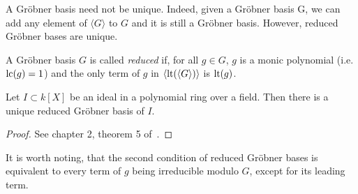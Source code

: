 A Gröbner basis need not be unique. Indeed, given a Gröbner basis G, we can add any element of $\langle G \rangle$ to $G$ and it is still a Gröbner basis. However, reduced Gröbner bases are unique.

\begin{definition}
  A Gröbner basis $G$ is called \textit{reduced} if, for all $g \in G$, $g$ is a monic polynomial (i.e. $\operatorname{lc}(g) = 1$) and the only term of $g$ in $\langle \operatorname{lt}(\langle G \rangle) \rangle$ is $\operatorname{lt}(g)$.
\end{definition}
\begin{theorem}
  Let $I \subset k[X]$ be an ideal in a polynomial ring over a field. Then there is a unique reduced Gröbner basis of $I$.
\end{theorem}
\begin{proof}
  See chapter 2, theorem 5 of~\cite{IVA}.
\end{proof}

It is worth noting, that the second condition of reduced Gröbner bases is equivalent to every term of $g$ being irreducible modulo $G$, except for its leading term.
